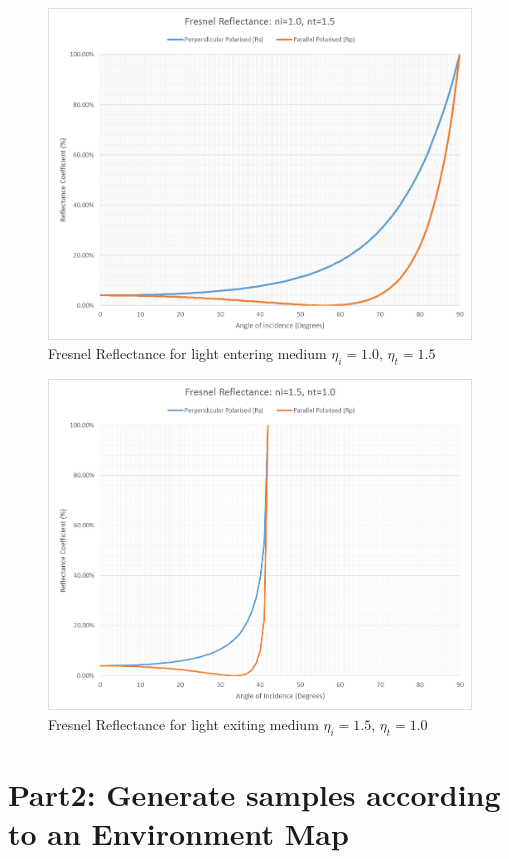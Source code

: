 \documentclass[fleqn, hidelinks]{article} %
\begin{document}
\begin{figure}
	\centering
	\includegraphics[width=\textwidth]{imgs/enter1.png}
	\caption{Fresnel Reflectance for light entering medium $\eta_{i} = 1.0$, $\eta_{t} = 1.5$}
	\label{fig:enter}
\end{figure}

\begin{figure}
	\centering
	\includegraphics[width=\textwidth]{imgs/exit1.png}
	\caption{Fresnel Reflectance for light exiting medium $\eta_{i} = 1.5$, $\eta_{t} = 1.0$}
	\label{fig:exit}
\end{figure}


\section{Part2: Generate samples according to an Environment Map}
\end{document}
